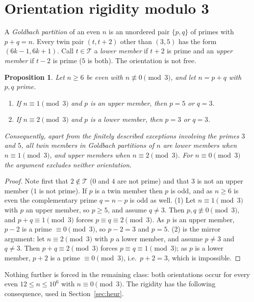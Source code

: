 \documentclass[10pt]{article}
\newtheorem{proposition}{Proposition}
\theoremstyle{definition}
\theoremstyle{remark}
\newcommand{\T}{\mathcal{T}}
\begin{document}
\section{Orientation rigidity modulo 3}\label{sec:mod3}

A \emph{Goldbach partition} of an even $n$ is an unordered pair $\{p, q\}$ of
primes with $p + q = n$. Every twin pair $(t, t+2)$ other than $(3,5)$ has the
form $(6k-1, 6k+1)$. Call $t \in \T$ a \emph{lower member} if $t+2$ is prime
and an \emph{upper member} if $t-2$ is prime ($5$ is both). The orientation is
not free.

\begin{proposition}\label{thm:orient}
Let $n \ge 6$ be even with $n \not\equiv 0 \pmod 3$, and let
$n = p + q$ with $p, q$ prime.
\begin{enumerate}
\item If $n \equiv 1 \pmod 3$ and $p$ is an upper member, then $p = 5$ or
$q = 3$.
\item If $n \equiv 2 \pmod 3$ and $p$ is a lower member, then $p = 3$ or
$q = 3$.
\end{enumerate}
Consequently, apart from the finitely described exceptions involving the
primes $3$ and $5$, all twin members in Goldbach partitions of $n$ are
lower members when $n \equiv 1 \pmod 3$, and upper members when
$n \equiv 2 \pmod 3$. For $n \equiv 0 \pmod 3$ the argument excludes
neither orientation.
\end{proposition}

\begin{proof}
Note first that $2 \notin \T$ ($0$ and $4$ are not prime) and that $3$ is
not an upper member ($1$ is not prime). If $p$ is a twin member then $p$
is odd, and as $n \ge 6$ is even the complementary prime $q = n - p$ is
odd as well. (1) Let $n \equiv 1 \pmod 3$ with $p$ an upper member, so
$p \ge 5$, and assume $q \ne 3$. Then $p, q \not\equiv 0 \pmod 3$, and
$p + q \equiv 1 \pmod 3$ forces $p \equiv q \equiv 2 \pmod 3$. As $p$ is
an upper member, $p - 2$ is a prime $\equiv 0 \pmod 3$, so $p - 2 = 3$ and
$p = 5$. (2) is the mirror argument: let $n \equiv 2 \pmod 3$ with $p$ a
lower member, and assume $p \ne 3$ and $q \ne 3$. Then
$p + q \equiv 2 \pmod 3$ forces $p \equiv q \equiv 1 \pmod 3$; as $p$ is a
lower member, $p + 2$ is a prime $\equiv 0 \pmod 3$, i.e.\ $p + 2 = 3$,
which is impossible.
\end{proof}

Nothing further is forced in the remaining class: both orientations occur for
every even $12 \le n \le 10^6$ with $n \equiv 0 \pmod 3$. The rigidity has the
following consequence, used in Section~\ref{sec:heur}.
\end{document}
